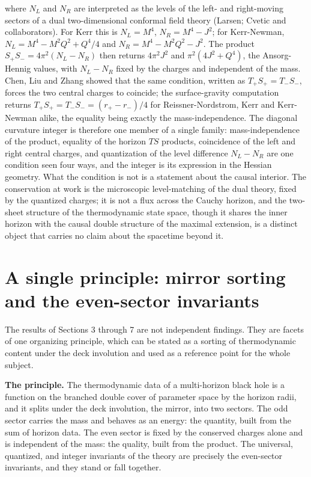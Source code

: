 \documentclass[11pt]{article}
\begin{document}
where $N_L$ and $N_R$ are interpreted as the levels of the left- and right-moving sectors of a dual two-dimensional conformal field theory (Larsen; Cvetic and collaborators). For Kerr this is $N_L = M^4$, $N_R = M^4 - J^2$; for Kerr-Newman, $N_L = M^4 - M^2Q^2 + Q^4/4$ and $N_R = M^4 - M^2Q^2 - J^2$. The product $S_+S_- = 4\pi^2(N_L - N_R)$ then returns $4\pi^2 J^2$ and $\pi^2(4J^2 + Q^4)$, the Ansorg-Hennig values, with $N_L - N_R$ fixed by the charges and independent of the mass. Chen, Liu and Zhang showed that the same condition, written as $T_+S_+ = T_-S_-$, forces the two central charges to coincide; the surface-gravity computation returns $T_+S_+ = T_-S_- = (r_+ - r_-)/4$ for Reissner-Nordstrom, Kerr and Kerr-Newman alike, the equality being exactly the mass-independence. The diagonal curvature integer is therefore one member of a single family: mass-independence of the product, equality of the horizon $TS$ products, coincidence of the left and right central charges, and quantization of the level difference $N_L - N_R$ are one condition seen four ways, and the integer is its expression in the Hessian geometry. What the condition is not is a statement about the causal interior. The conservation at work is the microscopic level-matching of the dual theory, fixed by the quantized charges; it is not a flux across the Cauchy horizon, and the two-sheet structure of the thermodynamic state space, though it shares the inner horizon with the causal double structure of the maximal extension, is a distinct object that carries no claim about the spacetime beyond it.



\section{A single principle: mirror sorting and the even-sector invariants}

The results of Sections 3 through 7 are not independent findings. They are facets of one organizing principle, which can be stated as a sorting of thermodynamic content under the deck involution and used as a reference point for the whole subject.

\textbf{The principle.} The thermodynamic data of a multi-horizon black hole is a function on the branched double cover of parameter space by the horizon radii, and it splits under the deck involution, the mirror, into two sectors. The odd sector carries the mass and behaves as an energy: the quantity, built from the sum of horizon data. The even sector is fixed by the conserved charges alone and is independent of the mass: the quality, built from the product. The universal, quantized, and integer invariants of the theory are precisely the even-sector invariants, and they stand or fall together.
\end{document}
